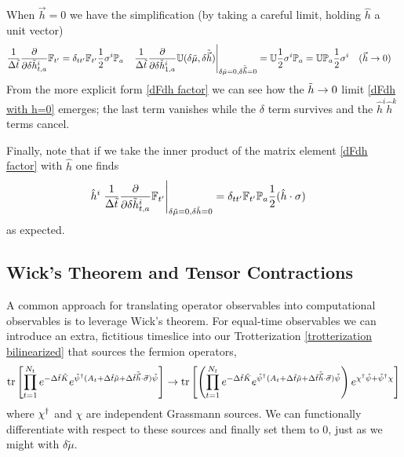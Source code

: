 When $\vec{h}=0$ we have the simplification (by taking a careful limit, holding $\hat{h}$ a unit vector)
\begin{align}
	\frac{1}{\Delta\tilde{t}} \frac{\partial}{\partial \delta\tilde{h}^i_{t,a}} \mathbb{F}_{t'} &= \delta_{tt'} \mathbb{F}_{t'} \frac{1}{2} \sigma^i \mathbb{P}_a
	&
	\left.\frac{1}{\Delta\tilde{t}} \frac{\partial}{\partial \delta\tilde{h}^i_{1,a}} \mathbb{U}(\delta\tilde{\mu}, \delta\tilde{\vec{h}})\right|_{\delta\tilde{\mu}=0, \delta\tilde{\vec{h}}=0}
	&= \mathbb{U} \frac{1}{2} \sigma^i \mathbb{P}_a = \mathbb{U} \mathbb{P}_a \frac{1}{2}\sigma^i 
	&
	(\vec{h} &\rightarrow 0)
	\label{eq:dFdh with h=0}
\end{align}
From the more explicit form \eqref{dFdh factor} we can see how the $\tilde{h}\rightarrow0$ limit \eqref{dFdh with h=0} emerges; the last term vanishes while the $\delta$ term survives and the $\hat{h}^i\hat{h}^k$ terms cancel.

Finally, note that if we take the inner product of the matrix element \eqref{dFdh factor} with $\hat{h}$ one finds
\begin{align}
	\hat{h}^i \left.\frac{1}{\Delta\tilde{t}}\frac{\partial}{\partial \delta \tilde{h}^i_{t,a}} \mathbb{F}_{t'}\right|_{\delta\tilde{\mu} = 0, \delta \tilde{h}=0}
	&= \delta_{tt'} \mathbb{F}_{t'} \mathbb{P}_a \frac{1}{2}(\hat{h}\cdot\sigma)
\end{align}
as expected.

\subsection{Wick's Theorem and Tensor Contractions}\label{sec:contractions}

A common approach for translating operator observables into computational observables is to leverage Wick's theorem.
For equal-time observables we can introduce an extra, fictitious timeslice into our Trotterization \eqref{trotterization bilinearized} that sources the fermion operators,
\begin{align}
	\text{tr}\left[\prod_{t=1}^{N_t} e^{-\Delta \tilde{t}\tilde{K}}  e^{ \tilde{\psi}{}^{\dagger} (A_t + \Delta\tilde{t} \tilde{\mu} + \Delta\tilde{t}\tilde{\vec{h}}\cdot\vec{\sigma}) \tilde{\psi} }\right]
	\rightarrow
	\text{tr}\left[\left(\prod_{t=1}^{N_t} e^{-\Delta \tilde{t}\tilde{K}}  e^{ \tilde{\psi}{}^{\dagger} (A_t + \Delta\tilde{t} \tilde{\mu} + \Delta\tilde{t}\tilde{\vec{h}}\cdot\vec{\sigma}) \tilde{\psi} }\right) e^{\chi{}^{\dagger} \tilde{\psi} + \tilde{\psi}{}^{\dagger} \chi}\right]
\end{align}
where $\chi{}^{\dagger}$ and $\chi$ are independent Grassmann sources.
We can functionally differentiate with respect to these sources and finally set them to 0, just as we might with $\delta\tilde{\mu}$.

